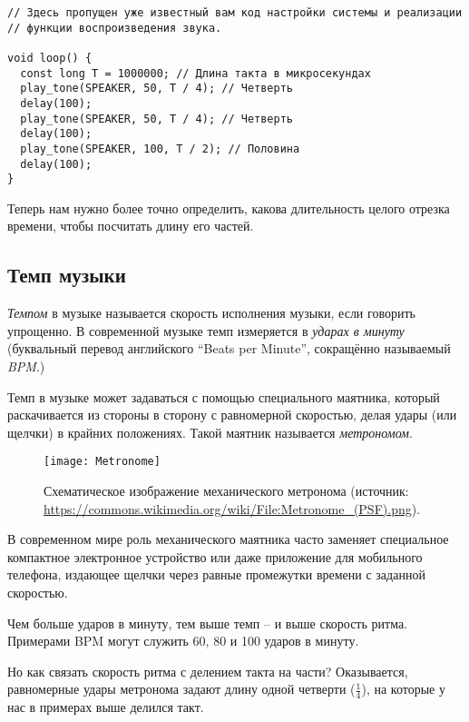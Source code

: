 \documentclass[../sparc.tex]{subfiles}
\begin{document}
\begin{verbatim}
// Здесь пропущен уже известный вам код настройки системы и реализации
// функции воспроизведения звука.

void loop() {
  const long T = 1000000; // Длина такта в микросекундах
  play_tone(SPEAKER, 50, T / 4); // Четверть
  delay(100);
  play_tone(SPEAKER, 50, T / 4); // Четверть
  delay(100);
  play_tone(SPEAKER, 100, T / 2); // Половина
  delay(100);
}
\end{verbatim}

Теперь нам нужно более точно определить, какова длительность целого отрезка
времени, чтобы посчитать длину его частей.

\subsection{Темп музыки}

\emph{Темпом} в музыке называется скорость исполнения музыки, если говорить
упрощенно. В современной музыке темп измеряется в \emph{ударах в минуту}
(буквальный перевод английского ``Beats per Minute'', сокращённо называемый
\emph{\gls{BPM}}.)

Темп в музыке может задаваться с помощью специального маятника, который
раскачивается из стороны в сторону с равномерной скоростью, делая удары (или
щелчки) в крайних положениях. Такой маятник называется \emph{метрономом}.

\begin{figure}[h]
  \centering
  \texttt{[image: Metronome]}
  \caption{Схематическое изображение механического метронома (источник:
    \url{https://commons.wikimedia.org/wiki/File:Metronome_(PSF).png}).}
  \label{fig:sound-metronome}
\end{figure}

В современном мире роль механического маятника часто заменяет специальное
компактное электронное устройство или даже приложение для мобильного телефона,
издающее щелчки через равные промежутки времени с заданной скоростью.

Чем больше ударов в минуту, тем выше темп -- и выше скорость ритма. Примерами BPM
могут служить 60, 80 и 100 ударов в минуту.

Но как связать скорость ритма с делением такта на части? Оказывается,
равномерные удары метронома задают длину одной четверти ($\frac{1}{4}$), на
которые у нас в примерах выше делился такт.
\end{document}
